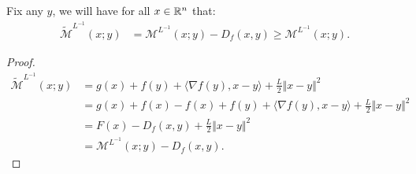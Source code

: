 \documentclass[12pt]{article}
\begin{document}
    \begin{lemma} 
        Fix any $y$, we will have for all $x \in \mathbb R^n$ that: 
        \begin{align*}
            \widetilde{\mathcal M}^{L^{-1}}(x; y)
            &= 
            \mathcal M^{L^{-1}}(x; y)- D_f(x, y) \ge \mathcal M^{L^{-1}}(x; y). 
        \end{align*}
    \end{lemma}
    \begin{proof}
        \begin{align*}
            \widetilde{\mathcal M}^{L^{-1}}(x; y) 
            &= 
            g(x) + f(y) + \langle \nabla f(y), x - y\rangle + \frac{L}{2}\Vert x - y\Vert^2
            \\
            &= 
            g(x) + f(x) - f(x) + f(y) 
            + \langle \nabla f(y), x - y\rangle + \frac{L}{2}\Vert x - y\Vert^2
            \\
            &= 
            F(x) - D_f(x, y) + \frac{L}{2}\Vert x - y\Vert^2 
            \\
            &= \mathcal M^{L^{-1}}(x; y) - D_f(x, y). 
        \end{align*}
    \end{proof}
    
\end{document}
